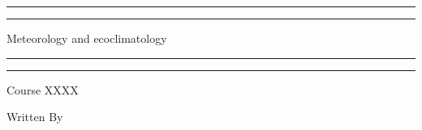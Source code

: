 \newcommand{\plogo}{\fbox{$\mathcal{PL}$}} %
\frontmatter


\begin{titlepage} %

	\centering %
	
	\scshape %
	
	\vspace*{\baselineskip} %
	
	
	\vspace{12\baselineskip}
	
	\rule{\textwidth}{1.6pt}\vspace*{-\baselineskip}\vspace*{2pt} %
	\rule{\textwidth}{0.4pt} %
	
	\vspace{0.75\baselineskip} %
	
	{\LARGE Meteorology and ecoclimatology\\} %
	
	\vspace{0.75\baselineskip} %
	
	\rule{\textwidth}{0.4pt}\vspace*{-\baselineskip}\vspace{3.2pt} %
	\rule{\textwidth}{1.6pt} %
	
	\vspace{2\baselineskip} %
	
	
	Course XXXX %
	
	\vspace*{3\baselineskip} %
	
	
	Written By
	
	\vspace{0.5\baselineskip} %
	

\end{titlepage}
